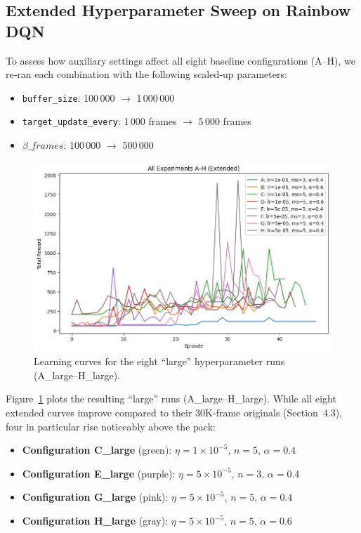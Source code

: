 \documentclass{article}
\begin{document}
\subsection{Extended Hyperparameter Sweep on Rainbow DQN}

To assess how auxiliary settings affect all eight baseline configurations (A–H), we re‑ran each combination with the following scaled‑up parameters:
\begin{itemize}
  \item \texttt{buffer\_size}: 100\,000 \(\to\) 1\,000\,000  
  \item \texttt{target\_update\_every}: 1\,000 frames \(\to\) 5\,000 frames  
  \item \(\beta\_frames\): 100\,000 \(\to\) 500\,000  
\end{itemize}

\begin{figure}[ht]
  \centering
  \includegraphics[width=0.9\linewidth]{rainbow_8Extended.png}
  \caption{Learning curves for the eight “large” hyperparameter runs (A\_large–H\_large).}
  \label{fig:extended_sweep}
\end{figure}

Figure~\ref{fig:extended_sweep} plots the resulting “large” runs (A\_large–H\_large). While all eight extended curves improve compared to their 30K‑frame originals (Section 4.3), four in particular rise noticeably above the pack:
\begin{itemize}
  \item \textbf{Configuration C\_large} (green): \(\eta=1\times10^{-5},\,n=5,\,\alpha=0.4\)  
  \item \textbf{Configuration E\_large} (purple): \(\eta=5\times10^{-5},\,n=3,\,\alpha=0.4\)  
  \item \textbf{Configuration G\_large} (pink): \(\eta=5\times10^{-5},\,n=5,\,\alpha=0.4\)  
  \item \textbf{Configuration H\_large} (gray): \(\eta=5\times10^{-5},\,n=5,\,\alpha=0.6\)  
\end{itemize}
\end{document}
